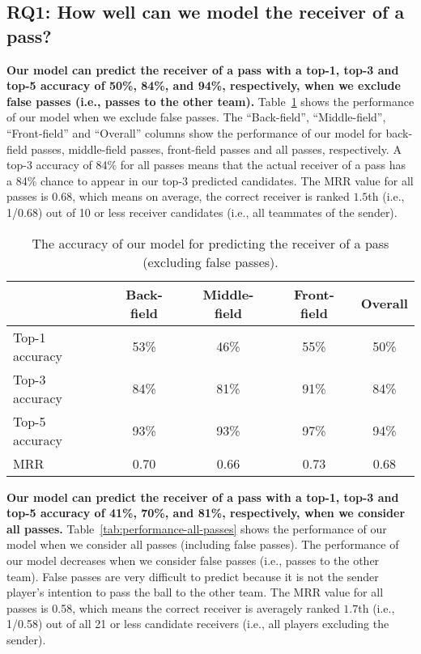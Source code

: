 \subsection{RQ1: How well can we model the receiver of a pass?}\label{RQ2-results}

\textbf{Our model can predict the receiver of a pass with a top-1, top-3 and top-5 accuracy of 50\%, 84\%, and 94\%, respectively, when we exclude false passes (i.e., passes to the other team).}
Table~\ref{tab:performance-accurate-passes} shows the performance of our model when we exclude false passes. 
The ``Back-field'', ``Middle-field'', ``Front-field'' and ``Overall'' columns show the performance of our model for back-field passes, middle-field passes, front-field passes and all passes, respectively. 
A top-3 accuracy of 84\% for all passes means that the actual receiver of a pass has a 84\% chance to appear in our top-3 predicted candidates.
The MRR value for all passes is 0.68, which means on average, the correct receiver is ranked $1.5$th (i.e., 1/0.68) out of 10 or less receiver candidates (i.e., all teammates of the sender).


\begin{table}[!t]
\caption{The accuracy of our model for predicting the receiver of a pass (excluding false passes).}
\centering
\begin{tabular}{lcccc}
  \hline
  & Back-field & Middle-field & Front-field & Overall \\
  \hline
  Top-1 accuracy & 53\% & 46\% & 55\% & 50\% \\
  Top-3 accuracy & 84\% & 81\% & 91\% & 84\% \\
  Top-5 accuracy & 93\% & 93\% & 97\% & 94\% \\
  MRR & 0.70 & 0.66 & 0.73 & 0.68 \\
  \hline
\end{tabular}
\label{tab:performance-accurate-passes}
\end{table}

\textbf{Our model can predict the receiver of a pass with a top-1, top-3 and top-5 accuracy of 41\%, 70\%, and 81\%, respectively, when we consider all passes.}
Table~\ref{tab:performance-all-passes} shows the performance of our model when we consider all passes (including false passes). 
The performance of our model decreases when we consider false passes (i.e., passes to the other team). 
False passes are very difficult to predict because it is not the sender player's intention to pass the ball to the other team. 
The MRR value for all passes is 0.58, which means the correct receiver is averagely ranked $1.7$th (i.e., 1/0.58) out of all 21 or less candidate receivers (i.e., all players excluding the sender).

